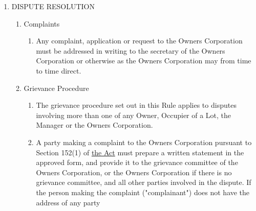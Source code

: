 \documentclass{article}
\begin{document}
\begin{enumerate}[label=\arabic*.]
\begin{enumerate}[label=\arabic{enumi}.\arabic*.]
\begin{enumerate}[label=\arabic{enumi}.\arabic*.]
\begin{enumerate}[label=(\arabic*)]
\begin{enumerate}[label=(\alph*)]
\item  not make any disturbing or irritating noises or install or use any appliance, engine, machine or instrument which causes or may be likely to cause noise or vibration on or about the Common Property or that can be heard or felt outside of the Lot in which the noise or vibration is emanating from;

\item  not hold or permit to be held any social gathering in its Lot or on Common Property which is likely to cause any such noise as set out in this Rule;

\item  not install or operate any intruder alarm which emits an audible signal or any external speakers or audio amplifiers on any balcony or adjoining areas without the written consent of the Owners Corporation.

\end{enumerate}

\end{enumerate}

\end{enumerate}

\item  DISPUTE RESOLUTION

\begin{enumerate}[label=\arabic{enumi}.\arabic*.]

\item  Complaints

\begin{enumerate}[label=(\arabic*)]

\item  Any complaint, application or request to the Owners Corporation must be addressed in writing to the secretary of the Owners Corporation or otherwise as the Owners Corporation may from time to time direct.

\end{enumerate}

\item  Grievance Procedure

\begin{enumerate}[label=(\arabic*)]

\item  The grievance procedure set out in this Rule applies to disputes involving more than one of any Owner, Occupier of a Lot, the Manager or the Owners Corporation.

\item  A party making a complaint to the Owners Corporation pursuant to Section 152(1) of \href{https://www.legislation.vic.gov.au/in-force/acts/owners-corporations-act-2006/021}{the Act} must prepare a written statement in the approved form, and provide it to the grievance committee of the Owners Corporation, or the Owners Corporation if there is no grievance committee, and all other parties involved in the dispute. If the person making the complaint ("complainant") does not have the address of any party
\newpage


\end{enumerate}
\end{enumerate}
\end{enumerate}
\end{enumerate}
\end{document}
